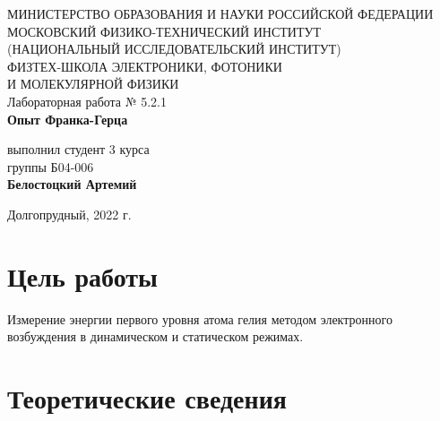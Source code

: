 \documentclass[a4paper,12pt]{article}
\begin{document}
 

\begin{titlepage}
	\begin{center}
		\large 	МИНИСТЕРСТВО ОБРАЗОВАНИЯ И НАУКИ РОССИЙСКОЙ ФЕДЕРАЦИИ\\
				МОСКОВСКИЙ ФИЗИКО-ТЕХНИЧЕСКИЙ ИНСТИТУТ \\
				(НАЦИОНАЛЬНЫЙ ИССЛЕДОВАТЕЛЬСКИЙ ИНСТИТУТ)\\ 
				ФИЗТЕХ-ШКОЛА ЭЛЕКТРОНИКИ, ФОТОНИКИ \\
				И МОЛЕКУЛЯРНОЙ ФИЗИКИ \\
		
		
		\vspace{4.0 cm}
		Лабораторная работа № 5.2.1 \\ 
		\LARGE \textbf{Опыт Франка-Герца}
	\end{center}
	\vspace{3 cm} \large
	
	\begin{flushright}
		выполнил студент 3 курса \\
		{группы Б04-006}\\
		\textbf{Белостоцкий Артемий}\\
	\end{flushright}
	
	\vfill

	\begin{center}
	Долгопрудный, 2022 г.
	\end{center}
\end{titlepage}                                                                      


\section*{Цель работы}
	
Измерение энергии первого уровня атома гелия методом электронного возбуждения в динамическом и статическом режимах.

\section*{Теоретические сведения}
\end{document}
